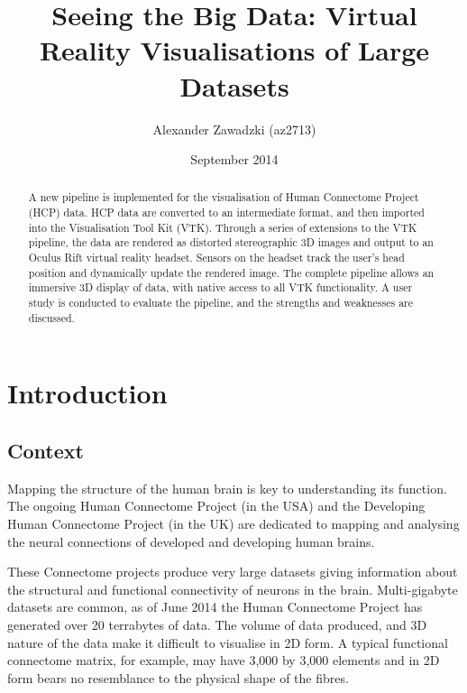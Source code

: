 \documentclass[MSc,paper=a4,pagesize=auto]{icldt}
\title{Seeing the Big Data: Virtual Reality Visualisations of Large Datasets}
\author{Alexander Zawadzki (az2713)}
\date{September 2014}
\begin{document}
\maketitle

\begin{abstract}
A new pipeline is implemented for the visualisation of Human Connectome Project (HCP) data. HCP data are converted to an intermediate format, and then imported into the Visualisation Tool Kit (VTK). Through a series of extensions to the VTK pipeline, the data are rendered as distorted stereographic 3D images and output to an Oculus Rift virtual reality headset. Sensors on the headset track the user's head position and dynamically update the rendered image. The complete pipeline allows an immersive 3D display of data, with native access to all VTK functionality. A user study is conducted to evaluate the pipeline, and the strengths and weaknesses are discussed.


\end{abstract}

\makededication
\tableofcontents
 
\listoffigures

\chapter{Introduction}
\section{Context}
Mapping the structure of the human brain is key to understanding its function. The ongoing Human Connectome Project (in the USA) and the Developing Human Connectome Project (in the UK) are dedicated to mapping and analysing the neural connections of developed and developing human brains. 

These Connectome projects produce very large datasets giving information about the structural and functional connectivity of neurons in the brain. Multi-gigabyte datasets are common, as of June 2014 the Human Connectome Project has generated over 20 terrabytes of data. The volume of data produced, and 3D nature of the data make it difficult to visualise in 2D form. A typical functional connectome matrix, for example, may have 3,000 by 3,000 elements and in 2D form bears no resemblance to the physical shape of the fibres.
\end{document}
